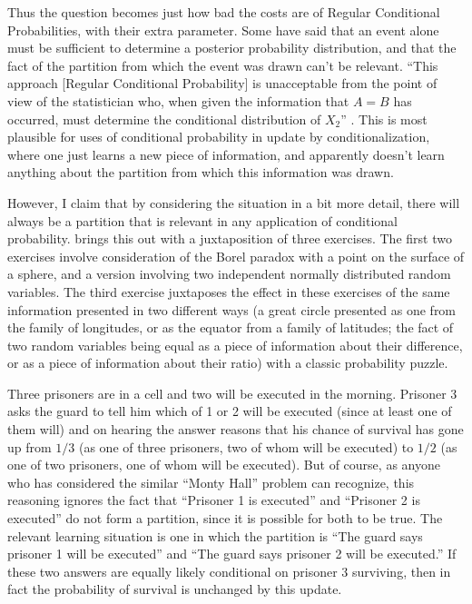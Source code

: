 Thus the question becomes just how bad the costs are of Regular Conditional Probabilities, with their extra parameter. Some have said that an event alone must be sufficient to determine a posterior probability distribution, and that the fact of the partition from which the event was drawn can't be relevant. ``This approach [Regular Conditional Probability] is unacceptable from the point of view of the statistician who, when given the information that $A=B$ has occurred, must determine the conditional distribution of $X_2$'' \citep{statimp}. This is most plausible for uses of conditional probability in update by conditionalization, where one just learns a new piece of information, and apparently doesn't learn anything about the partition from which this information was drawn.

However, I claim that by considering the situation in a bit more detail, there will always be a partition that is relevant in any application of conditional probability. \citet[end of section 33]{billingsley} brings this out with a juxtaposition of three exercises. The first two exercises involve consideration of the Borel paradox with a point on the surface of a sphere, and a version involving two independent normally distributed random variables. The third exercise juxtaposes the effect in these exercises of the same information presented in two different ways (a great circle presented as one from the family of longitudes, or as the equator from a family of latitudes; the fact of two random variables being equal as a piece of information about their difference, or as a piece of information about their ratio) with a classic probability puzzle. 

Three prisoners are in a cell and two will be executed in the morning. Prisoner 3 asks the guard to tell him which of 1 or 2 will be executed (since at least one of them will) and on hearing the answer reasons that his chance of survival has gone up from $1/3$ (as one of three prisoners, two of whom will be executed) to $1/2$ (as one of two prisoners, one of whom will be executed). But of course, as anyone who has considered the similar ``Monty Hall'' problem can recognize, this reasoning ignores the fact that ``Prisoner 1 is executed'' and ``Prisoner 2 is executed'' do not form a partition, since it is possible for both to be true. The relevant learning situation is one in which the partition is ``The guard says prisoner 1 will be executed'' and ``The guard says prisoner 2 will be executed.'' If these two answers are equally likely conditional on prisoner 3 surviving, then in fact the probability of survival is unchanged by this update.

